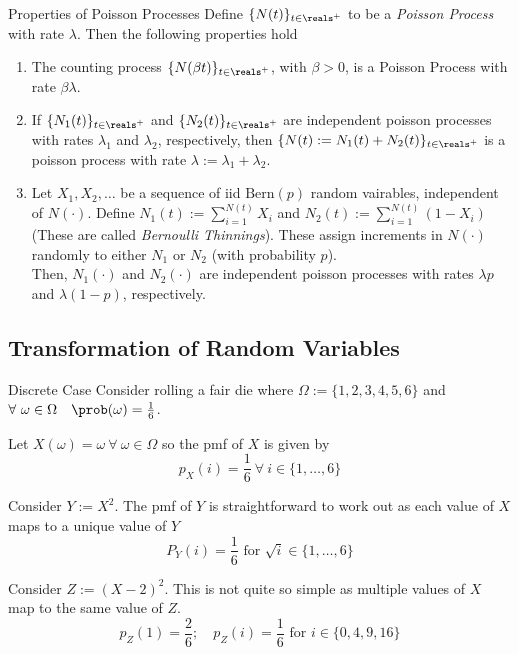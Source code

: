 \documentclass[11pt,a4paper]{article}
\begin{document}
  \begin{proposition}{Properties of Poisson Processes}
    Define $\{N(t)\}_{t\in\reals^+}$ to be a \textit{Poisson Process} with rate $\lambda$. Then the following properties hold
    \begin{enumerate}
      \item The counting process $\{N(\beta t)\}_{t\in\reals^+}$, with $\beta>0$, is a Poisson Process with rate $\beta\lambda$.
      \item If $\{N_1(t)\}_{t\in\reals^+}$ and $\{N_2(t)\}_{t\in\reals^+}$ are independent poisson processes with rates $\lambda_1$ and $\lambda_2$, respectively, then $\{N(t):=N_1(t)+N_2(t)\}_{t\in\reals^+}$ is a poisson process with rate $\lambda:=\lambda_1+\lambda_2$.
      \item Let $X_1,X_2,\dots$ be a sequence of iid $\text{Bern}(p)$ random vairables, independent of $N(\cdot)$. Define $N_1(t):=\sum_{i=1}^{N(t)}X_i$ and $N_2(t):=\sum_{i=1}^{N(t)}(1-X_i)$ (These are called \textit{Bernoulli Thinnings}). These assign increments in $N(\cdot)$ randomly to either $N_1$ or $N_2$ (with probability $p$).\\
      Then, $N_1(\cdot)$ and $N_2(\cdot)$ are independent poisson processes with rates $\lambda p$ and $\lambda(1-p)$, respectively.
    \end{enumerate}
  \end{proposition}

\subsection{Transformation of Random Variables}

  \begin{example}{Discrete Case}
    Consider rolling a fair die where $\Omega:=\{1,2,3,4,5,6\}$ and $\forall\ \omega\in\Omega\quad\prob(\omega)=\frac16$.
    \par Let $X(\omega)=\omega\ \forall\ \omega\in\Omega$ so the pmf of $X$ is given by
    \[ p_X(i)=\frac16\ \forall\ i\in\{1,\dots,6\} \]
    \par Consider $Y:=X^2$. The pmf of $Y$ is straightforward to work out as each value of $X$ maps to a unique value of $Y$
    \[ P_Y(i)=\frac16\text{ for }\sqrt{i}\in\{1,\dots,6\} \]
    \par Consider $Z:=(X-2)^2$. This is not quite so simple as multiple values of $X$ map to the same value of $Z$.
    \[ p_Z(1)=\frac26;\quad p_Z(i)=\frac16\text{ for }i\in\{0,4,9,16\} \]
  \end{example}
\end{document}
